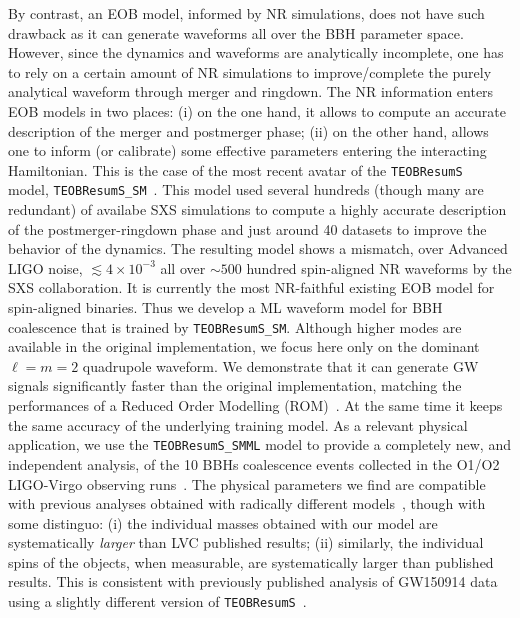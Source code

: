 By contrast, an EOB model, informed by NR simulations, does not have such drawback as it can generate 
waveforms all over the BBH parameter space. However, since the dynamics and waveforms are analytically
incomplete, one has to rely on a certain amount of NR simulations to improve/complete the purely analytical
waveform through merger and ringdown. The NR information enters EOB models in two places: (i) on the one
hand, it allows to compute an accurate description of the merger and postmerger phase; (ii) on the other hand,
allows one to inform (or calibrate) some effective parameters entering the interacting Hamiltonian.
This is the case of the most recent avatar of the \texttt{TEOBResumS}~\cite{Nagar:2018zoe} model, 
\texttt{TEOBResumS\_SM}~\cite{Nagar:2020pcj}. This model used several hundreds (though many are redundant)
of availabe SXS simulations to compute a highly accurate description of the postmerger-ringdown phase
and just around 40 datasets to improve the behavior of the dynamics. The resulting model shows a 
mismatch, over Advanced LIGO noise, $\lesssim 4\times 10^{-3}$ all over $\sim 500$ hundred spin-aligned 
NR waveforms by the SXS collaboration. It is currently the most NR-faithful existing EOB model for spin-aligned 
binaries.
Thus we develop a ML waveform model for BBH coalescence that is trained by \texttt{TEOBResumS\_SM}.
Although higher modes are available in the original implementation, we focus here only on the dominant $\ell=m=2$
quadrupole waveform. We demonstrate that it can generate GW signals significantly faster than 
the original implementation, matching the performances of a Reduced Order Modelling 
(ROM)~\cite{Purrer_2014_ROM,Purrer_2016_FDROM,Boh2017SEOBNRv4}. 
At the same time it keeps the same accuracy of the underlying training model.
As a relevant physical application, we use the \texttt{TEOBResumS\_SMML} model to provide a completely new,
and independent analysis, of the 10 BBHs coalescence events collected in the O1/O2 LIGO-Virgo observing 
runs~\cite{LIGOScientific:2018mvr}. The physical parameters we find are compatible with previous
analyses obtained with radically different models~\cite{LIGOScientific:2018mvr}, though with some distinguo: 
(i) the individual masses obtained with our model are systematically {\it larger} than LVC published results; 
(ii) similarly, the individual spins of the objects, when measurable, are systematically larger than published
results. This is consistent with previously published analysis of GW150914 data using a slightly different version 
of \texttt{TEOBResumS}~\cite{Nagar:2018zoe}.


